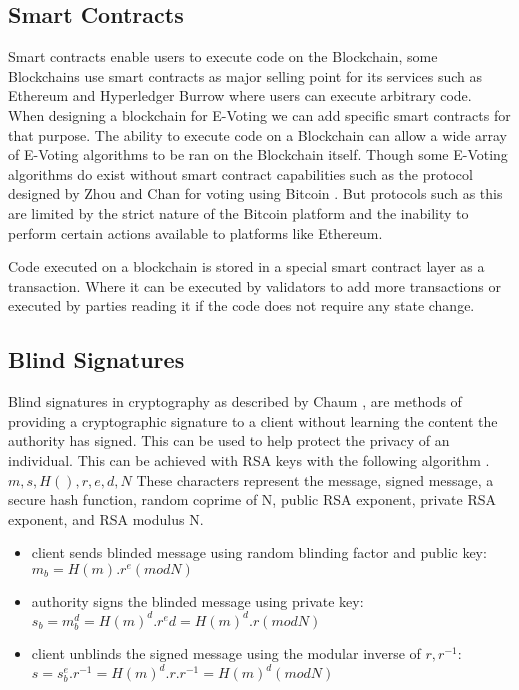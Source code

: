 \documentclass{entcs}
\begin{document}
\subsection{Smart Contracts}
Smart contracts enable users to execute code on the Blockchain, some Blockchains use smart contracts as major selling point for its services such as Ethereum \cite{wood2014ethereum} and Hyperledger Burrow \cite{HyperLedgerBurrow} where users can execute arbitrary code. When designing a blockchain for E-Voting we can add specific smart contracts for that purpose. The ability to execute code on a Blockchain can allow a wide array of E-Voting algorithms to be ran on the Blockchain itself. Though some E-Voting algorithms do exist without smart contract capabilities such as the protocol designed by Zhou and Chan for voting using Bitcoin \cite{zhao2015vote}. But protocols such as this are limited by the strict nature of the Bitcoin platform and the inability to perform certain actions available to platforms like Ethereum.

Code executed on a blockchain is stored in a special smart contract layer as a transaction. Where it can be executed by validators to add more transactions or executed by parties reading it if the code does not require any state change.


\subsection{Blind Signatures}
Blind signatures in cryptography as described by Chaum \cite{chaum1983blind}, are methods of providing a cryptographic signature to a client without learning the content the authority has signed. This can be used to help protect the privacy of an individual. This can be achieved with RSA keys with the following algorithm \cite{MITcrypto}.
\(m, s, H(), r, e, d, N\) These characters represent the message, signed message, a secure hash function, random coprime of N, public RSA exponent, private RSA exponent, and RSA modulus N.
\begin{itemize}
    \item client sends blinded message using random blinding factor and public key: \\
    \(m_b = H(m).r^e (mod N)\)
    \item authority signs the blinded message using private key: \\
    \(s_b = m^d_b = H(m)^d.r^ed = H(m)^d.r (mod N)\)
    \item client unblinds the signed message using the modular inverse of \(r, r^{-1}\): \\
    \(s = s^e_b.r^{-1} = H(m)^d.r.r^{-1} = H(m)^d (mod N)\)
\end{itemize}
\end{document}
